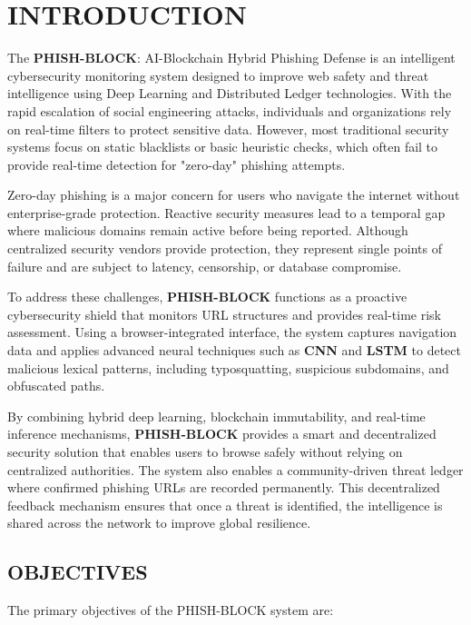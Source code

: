 \chapter{INTRODUCTION}

The \textbf{PHISH-BLOCK}: AI-Blockchain Hybrid Phishing Defense is an intelligent cybersecurity monitoring system designed to improve web safety and threat intelligence using Deep Learning and Distributed Ledger technologies. With the rapid escalation of social engineering attacks, individuals and organizations rely on real-time filters to protect sensitive data. However, most traditional security systems focus on static blacklists or basic heuristic checks, which often fail to provide real-time detection for "zero-day" phishing attempts.

Zero-day phishing is a major concern for users who navigate the internet without enterprise-grade protection. Reactive security measures lead to a temporal gap where malicious domains remain active before being reported. Although centralized security vendors provide protection, they represent single points of failure and are subject to latency, censorship, or database compromise.

To address these challenges, \textbf{PHISH-BLOCK} functions as a proactive cybersecurity shield that monitors URL structures and provides real-time risk assessment. Using a browser-integrated interface, the system captures navigation data and applies advanced neural techniques such as \textbf{CNN} and \textbf{LSTM} to detect malicious lexical patterns, including typosquatting, suspicious subdomains, and obfuscated paths.

By combining hybrid deep learning, blockchain immutability, and real-time inference mechanisms, \textbf{PHISH-BLOCK} provides a smart and decentralized security solution that enables users to browse safely without relying on centralized authorities. The system also enables a community-driven threat ledger where confirmed phishing URLs are recorded permanently. This decentralized feedback mechanism ensures that once a threat is identified, the intelligence is shared across the network to improve global resilience.

\newpage

\section{OBJECTIVES}

The primary objectives of the PHISH-BLOCK system are:

